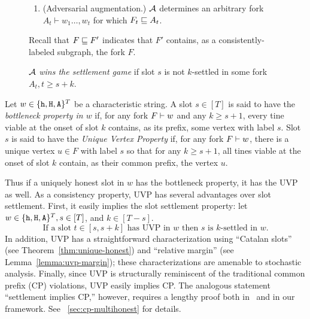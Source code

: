 \begin{figure*}[t]
\begin{center}
{\begin{minipage}{\textwidth}
\begin{enumerate}
\begin{enumerate}
            \item (Adversarial augmentation.) $\mathcal{A}$ determines an
              arbitrary fork $A_t \vdash w_1 \ldots, w_{t}$ for
              which $F_{t} \sqsubseteq A_{t}$.
            \end{enumerate}
             Recall that $F \sqsubseteq F'$ indicates that $F'$
              contains, as a consistently-labeled subgraph, the fork $F$.
          \end{enumerate}
          $\mathcal{A}$ \emph{wins the settlement game} if slot $s$ is not
          $k$-settled in some fork $A_t, t \geq s+k$.
        \end{minipage}
      }
    \end{center}
  \end{figure*}



  \begin{definition}\label{def:bottleneck-property}\label{def:unique-vertex-property}
    Let $w \in \{\mathtt{h}, \mathtt{H}, \mathtt{A}\}^T$ be a characteristic string.  
    A slot $s \in [T]$ is said to have the 
    \emph{bottleneck property in $w$} 
    if, 
    for any fork $F \vdash w$ 
    and any $k \geq s + 1$, 
    every tine viable at the onset of slot $k$ 
    contains, as its prefix, some vertex with label $s$.       
    Slot $s$ is said to have the \emph{Unique Vertex Property} 
    if, 
    for any fork $F \vdash w$, 
    there is a unique vertex $u \in F$ with label $s$ 
    so that 
    for any $k \geq s + 1$, 
    all tines viable at the onset of slot $k$ 
    contain, as their common prefix, 
    the vertex $u$.
  \end{definition}
  Thus 
  if a uniquely honest slot in $w$ has the bottleneck property, 
  it has the UVP as well.
  As a consistency property, UVP has several advantages over slot settlement. 
  First, it easily implies the slot settlement property:
  let $w \in \{\mathtt{h}, \mathtt{H}, \mathtt{A}\}^T, s \in [T]$, and $k \in [T - s]$. 
  \begin{equation}\label{eq:settlement-uvp}
    \text{If a slot $t \in [s, s + k]$ has UVP in $w$ 
    then $s$ is $k$-settled in $w$.}     
  \end{equation}  
  In addition, UVP has a straightforward characterization 
  using ``Catalan slots'' 
  (see Theorem~\ref{thm:unique-honest}) 
  and ``relative margin'' 
  (see Lemma~\ref{lemma:uvp-margin}); 
  these characterizations are amenable to stochastic analysis. 
  Finally, since UVP is structurally reminiscent of the traditional common prefix (CP) violations, 
  UVP easily implies CP. 
  The analogous statement ``settlement implies CP,'' however, 
  requires a lengthy proof both in~\cite{LinearConsistency} and in 
  our framework. See 
  \Section~\ref{sec:cp-multihonest}
  for details.




